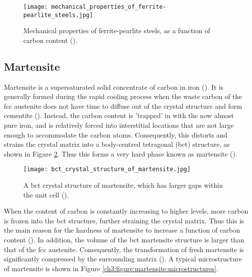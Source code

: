 \begin{figure}[H]
    \centering
    \texttt{[image: mechanical\_properties\_of\_ferrite-pearlite\_steels.jpg]}
    \caption{Mechanical properties of ferrite-pearlite steels, as a function of carbon content (\cite{molabe2018determining}). }
    \label{ch3:figure:properties}
\end{figure}

\subsection{Martensite}
Martensite is a supersaturated solid concentrate of carbon in iron (\cite{molabe2018determining}). It is generally formed during the rapid cooling process when the waste carbon of the fcc austenite does not have time to diffuse out of the crystal structure and form cementite (\cite{bajaj2020steels}). Instead, the carbon content is 'trapped' in with the now almost pure iron, and is relatively forced into interstitial locations that are not large enough to accommodate the carbon atoms. Consequently, this distorts and strains the crystal matrix into a body-centred tetragonal (bct) structure, as shown in Figure \ref{ch3:figure:martensite}. Thus this forms a very hard phase known as martensite (\cite{molabe2018determining}).
 
\begin{figure}[H]
    \centering
    \texttt{[image: bct\_crystal\_structure\_of\_martensite.jpg]}
    \caption{A bct crystal structure of martensite, which has larger gaps within the unit cell (\cite{bajaj2020steels}).}
    \label{ch3:figure:martensite}
\end{figure}

When the content of carbon is constantly increasing to higher levels, more carbon is frozen into the bct structure, further straining the crystal matrix. Thus this is the main reason for the hardness of martensite to increase a function of carbon content (\cite{bajaj2020steels}). In addition, the volume of the bct martensite structure is larger than that of the fcc austenite. Consequently, the transformation of fresh martensite is significantly compressed by the surrounding matrix (\cite{bajaj2020steels}). A typical microstructure of martensite is shown in Figure \ref{ch3:figure:martensite:microstructures}.

